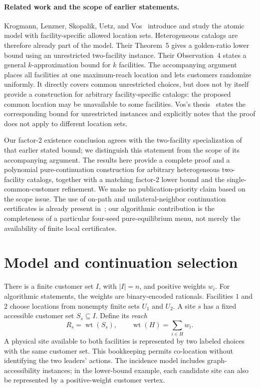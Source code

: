 \documentclass[11pt]{article}
\theoremstyle{definition}
\theoremstyle{remark}
\newcommand{\wt}{\operatorname{wt}}
\newcommand{\Uone}{U_1}
\newcommand{\Utwo}{U_2}
\begin{document}
\paragraph{Related work and the scope of earlier statements.}
Krogmann, Lenzner, Skopalik, Uetz, and Vos~\cite{krogmann2024} introduce and study the atomic model with facility-specific allowed location sets. Heterogeneous catalogs are therefore already part of the model. Their Theorem~5 gives a golden-ratio lower bound using an unrestricted two-facility instance. Their Observation~4 states a general $k$-approximation bound for $k$ facilities. The accompanying argument places all facilities at one maximum-reach location and lets customers randomize uniformly. It directly covers common unrestricted choices, but does not by itself provide a construction for arbitrary facility-specific catalogs: the proposed common location may be unavailable to some facilities. Vos's thesis~\cite[Chapter~8, Theorem~17]{vos2023} states the corresponding bound for unrestricted instances and explicitly notes that the proof does not apply to different location sets.

Our factor-$2$ existence conclusion agrees with the two-facility specialization of that earlier stated bound; we distinguish this statement from the scope of its accompanying argument. The results here provide a complete proof and a polynomial pure-continuation construction for arbitrary heterogeneous two-facility catalogs, together with a matching factor-$2$ lower bound and the single-common-customer refinement. We make no publication-priority claim based on the scope issue. The use of on-path and unilateral-neighbor continuation certificates is already present in~\cite[Theorem~6]{krogmann2024}; our algorithmic contribution is the completeness of a particular four-seed pure-equilibrium menu, not merely the availability of finite local certificates.

\section{Model and continuation selection}\label{sec:model}

There is a finite customer set $I$, with $|I|=n$, and positive weights $w_i$. For algorithmic statements, the weights are binary-encoded rationals. Facilities $1$ and $2$ choose locations from nonempty finite sets $\Uone$ and $\Utwo$. A site $s$ has a fixed accessible customer set $S_s\subseteq I$. Define its \emph{reach}
\[
 R_s=\wt(S_s),\qquad \wt(H)=\sum_{i\in H}w_i.
\]
A physical site available to both facilities is represented by two labeled choices with the same customer set. This bookkeeping permits co-location without identifying the two leaders' actions. The incidence model includes graph-accessibility instances; in the lower-bound example, each candidate site can also be represented by a positive-weight customer vertex.
\end{document}
